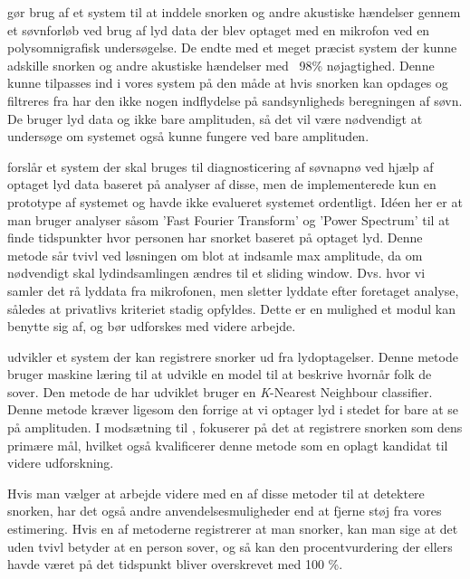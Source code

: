 \citet{Dafna2013} gør brug af et system til at inddele snorken og andre akustiske hændelser gennem et søvnforløb ved brug af lyd data der blev optaget med en mikrofon ved en polysomnigrafisk undersøgelse. 
De endte med et meget præcist system der kunne adskille snorken og andre akustiske hændelser med ~98\% nøjagtighed.
Denne kunne tilpasses ind i vores system på den måde at hvis snorken kan opdages og filtreres fra har den ikke nogen indflydelse på sandsynligheds beregningen af søvn. 
De bruger lyd data og ikke bare amplituden, så det vil være nødvendigt at undersøge om systemet også kunne fungere ved bare amplituden.

\citet{Calabrese20111101} forslår et system der skal bruges til diagnosticering af søvnapnø ved hjælp af optaget lyd data baseret på analyser af disse, men de implementerede kun en prototype af systemet og havde ikke evalueret systemet ordentligt. 
Idéen her er at man bruger analyser såsom 'Fast Fourier Transform' og 'Power Spectrum' til at finde tidspunkter hvor personen har snorket baseret på optaget lyd. 
Denne metode sår tvivl ved løsningen om blot at indsamle max amplitude, da om nødvendigt skal lydindsamlingen ændres til et sliding window.
Dvs. hvor vi samler det rå lyddata fra mikrofonen, men sletter lyddate efter foretaget analyse, således at privatlivs kriteriet stadig opfyldes.
Dette er en mulighed et modul kan benytte sig af, og bør udforskes med videre arbejde.

\citet{7051338} udvikler et system der kan registrere snorker ud fra lydoptagelser.
Denne metode bruger maskine læring til at udvikle en model til at beskrive hvornår folk de sover.
Den metode de har udviklet bruger en \textit{K}-Nearest Neighbour classifier.
Denne metode kræver ligesom den forrige at vi optager lyd i stedet for bare at se på amplituden.
I modsætning til \citet{Calabrese20111101}, fokuserer \citet{7051338} på det at registrere snorken som dens primære mål, hvilket også kvalificerer denne metode som en oplagt kandidat til videre udforskning.

Hvis man vælger at arbejde videre med en af disse metoder til at detektere snorken, har det også andre anvendelsesmuligheder end at fjerne støj fra vores estimering.
Hvis en af metoderne registrerer at man snorker, kan man sige at det uden tvivl betyder at en person sover, og så kan den procentvurdering der ellers havde været på det tidspunkt bliver overskrevet med 100 \%.
